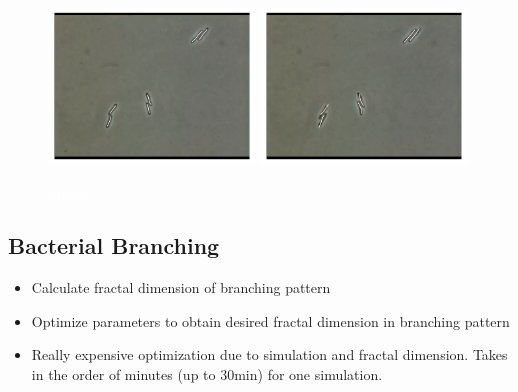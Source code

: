 \documentclass{article}
\newcommand{\todo}[1]{\colorbox{WildStrawberry}{\textcolor{white}{#1}}}
\begin{document}
\begin{figure}[H]
    \includegraphics[width=0.49\textwidth]{figures/cr_mech_coli/estim-param/microscopic-images-0.png}%
    \includegraphics[width=0.49\textwidth]{figures/cr_mech_coli/estim-param/microscopic-images-1.png}%
    \caption{\todo{caption}}
    \label{fig:bacterial-rods-sim}
\end{figure}

\subsection{Bacterial Branching}
\label{subsection:bacterial-branching}
\begin{itemize}
    \item Calculate fractal dimension of branching pattern
    \item Optimize parameters to obtain desired fractal dimension in branching pattern
    \item Really expensive optimization due to simulation and fractal dimension.
        Takes in the order of minutes (up to $30$min) for one simulation.
\end{itemize}
\end{document}
